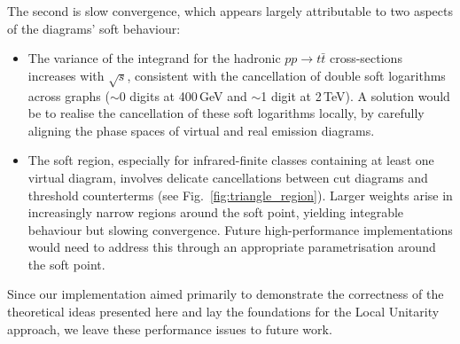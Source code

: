 \documentclass[%
 reprint,
 amsmath,amssymb,
 superscriptaddress,
 aps,
 preprintnumbers,
prl,
floatfix,
]{revtex4-2}
\begin{document}
The second is slow convergence, which appears largely attributable to two aspects of the diagrams' soft behaviour:
\begin{itemize}
\item The variance of the integrand for the hadronic $pp\rightarrow t\bar{t}$ cross-sections increases with $\sqrt{s}$, consistent with the cancellation of double soft logarithms across graphs ($\sim$0 digits at 400\,GeV and $\sim$1 digit at 2\,TeV).
A solution would be to realise the cancellation of these soft logarithms locally, by carefully aligning the phase spaces of virtual and real emission diagrams.

\item The soft region, especially for infrared-finite classes containing at least one virtual diagram, involves delicate cancellations between cut diagrams and threshold counterterms (see Fig.~\ref{fig:triangle_region}). Larger weights arise in increasingly narrow regions around the soft point, yielding integrable behaviour but slowing convergence. Future high-performance implementations would need to address this through an appropriate parametrisation around the soft point.
\end{itemize}

Since our implementation aimed primarily to demonstrate the correctness of the theoretical ideas presented here and lay the foundations for the Local Unitarity approach, we leave these performance issues to future work.

\phantom{g}\\
\phantom{g}\\
\phantom{g}
\end{document}
